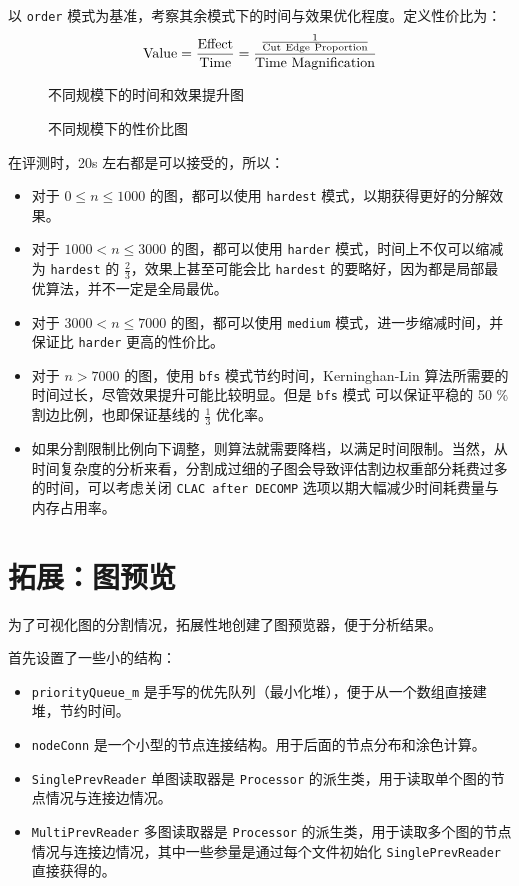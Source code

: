 \documentclass[a4paper,12pt]{article}
\begin{document}
\begin{CJK}{UTF8}{song}
以 \texttt{order} 模式为基准，考察其余模式下的时间与效果优化程度。定义性价比为：
\begin{equation}
    \text{Value} = \frac{\rm Effect}{\rm Time} = \frac{\frac{1}{\rm Cut~Edge~Proportion}}{\rm Time~Magnification}
\end{equation}

\begin{figure}[H]
    \centering
    
    
    \caption{不同规模下的时间和效果提升图}
\end{figure}

\begin{figure}[H]
    \centering
    
    \caption{不同规模下的性价比图}
\end{figure}

在评测时，20s 左右都是可以接受的，所以：
\begin{itemize}
    \item 对于 $0\leq n\leq 1000$ 的图，都可以使用 \texttt{hardest} 模式，以期获得更好的分解效果。
    \item 对于 $1000 < n\leq 3000$ 的图，都可以使用 \texttt{harder} 模式，时间上不仅可以缩减为 \texttt{hardest} 的 $\frac{2}{3}$，效果上甚至可能会比 \texttt{hardest} 的要略好，因为都是局部最优算法，并不一定是全局最优。
    \item 对于 $3000 < n \leq 7000$ 的图，都可以使用 \texttt{medium} 模式，进一步缩减时间，并保证比 \texttt{harder} 更高的性价比。
    \item 对于 $n > 7000$ 的图，使用 \texttt{bfs} 模式节约时间，Kerninghan-Lin 算法所需要的时间过长，尽管效果提升可能比较明显。但是 \texttt{bfs} 模式 可以保证平稳的 50 \% 割边比例，也即保证基线的 $\frac{1}{3}$ 优化率。
    \item 如果分割限制比例向下调整，则算法就需要降档，以满足时间限制。当然，从时间复杂度的分析来看，分割成过细的子图会导致评估割边权重部分耗费过多的时间，可以考虑关闭 \texttt{CLAC after DECOMP} 选项以期大幅减少时间耗费量与内存占用率。
\end{itemize}

\section{拓展：图预览}

为了可视化图的分割情况，拓展性地创建了图预览器，便于分析结果。

首先设置了一些小的结构：

\begin{itemize}
\item
  \texttt{priorityQueue\_m}
  是手写的优先队列（最小化堆），便于从一个数组直接建堆，节约时间。
\item
  \texttt{nodeConn}
  是一个小型的节点连接结构。用于后面的节点分布和涂色计算。
\item
  \texttt{SinglePrevReader} 单图读取器是 \texttt{Processor}
  的派生类，用于读取单个图的节点情况与连接边情况。
\item
  \texttt{MultiPrevReader} 多图读取器是 \texttt{Processor}
  的派生类，用于读取多个图的节点情况与连接边情况，其中一些参量是通过每个文件初始化
  \texttt{SinglePrevReader} 直接获得的。
\end{itemize}


\end{CJK}
\end{document}
